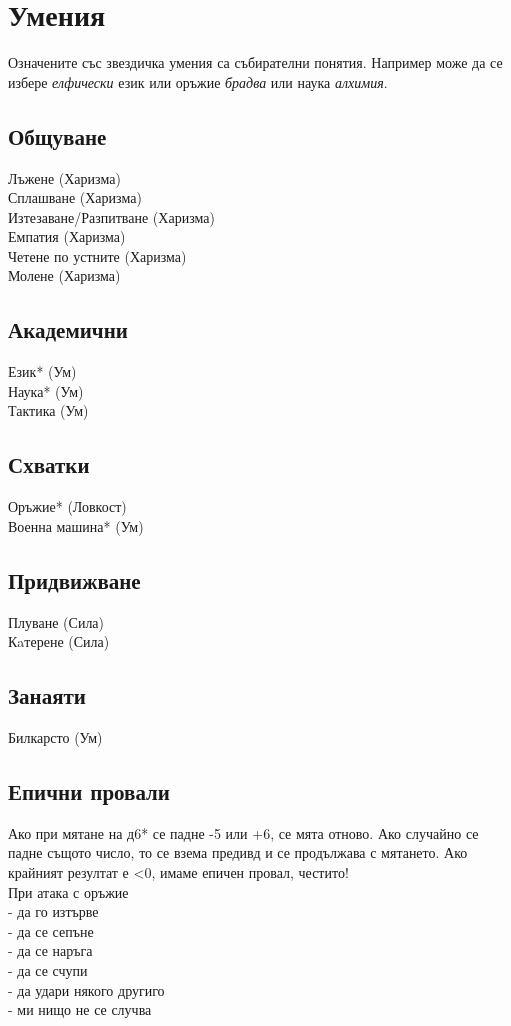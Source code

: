 
\section{Умения}
Означените със звездичка умения са събирателни понятия.
Например може да се избере \textit{елфически} език или оръжие \textit{брадва} или наука \textit{алхимия}.
\subsection{Общуване}
Лъжене (Харизма)                  \\
Сплашване (Харизма)               \\
Изтезаване/Разпитване (Харизма)   \\
Емпатия (Харизма)                 \\
Четене по устните (Харизма)       \\
Молене (Харизма)                  \\

\subsection{Академични}
Език* (Ум)                        \\
Наука* (Ум)                       \\
Тактика (Ум)                      \\

\subsection{Схватки}
Оръжие* (Ловкост)                 \\
Военна машина* (Ум)               \\

\subsection{Придвижване}
Плуване (Сила)                    \\
Кaтерене (Сила)                   \\

\subsection{Занаяти}
Билкарсто (Ум)                    \\

\subsection{Епични провали}
Ако при мятане на д6* се падне -5 или +6, се мята отново.
Ако случайно се падне същото число, то се взема предивд и се продължава с мятането.
Ако крайният резултат е <0, имаме епичен провал, честито!  \\

При атака с оръжие           \\
- да го изтърве              \\
- да се сепъне               \\
- да се наръга               \\
- да се счупи                \\
- да удари някого другиго    \\
- ми нищо не се случва       \\
